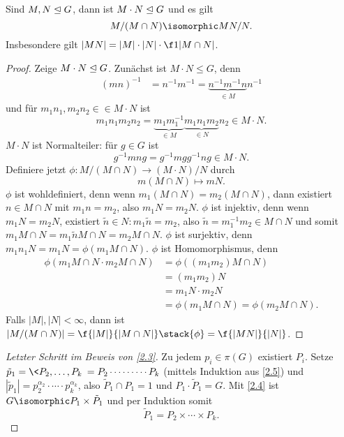 \begin{lem} \label{2.5}
	Sind $M, N \trianglelefteq G$, dann ist $M\cdot N \trianglelefteq G$ und es gilt
	\[
		M / (M\cap N)
		\isomorphic
		MN / N.
	\]
	Insbesondere gilt $|MN| = |M|\cdot|N| \cdot \f 1{|M \cap N|}$.
	\begin{proof}
		Zeige $M\cdot N \trianglelefteq G$.
		Zunächst ist $M \cdot N \le G$, denn
		\begin{align*}
			(mn)^{-1} &= n^{-1} m^{-1}
			= \underbrace{n^{-1}m^{-1}n}_{\in M} n^{-1}
		\end{align*}
		und für $m_1n_1, m_2n_2 \in \in M\cdot N$ ist
		\[
			m_1 n_1 m_2 n_2
			= \underbrace{m_1 m_1^{-1}}_{\in M} \underbrace{m_1 n_1 m_2}_{\in N} n_2
			\in M \cdot N.
		\]
		$M \cdot N$ ist Normalteiler:
		für $g \in G$ ist
		\[
			g^{-1} mn g
			= g^{-1} m g g^{-1} n g
			\in M \cdot N.
		\]
		Definiere jetzt $\phi: M / (M \cap N) \to (M \cdot N) / N$ durch
		\[
			m(M\cap N) \mapsto mN.
		\]
		$\phi$ ist wohldefiniert, denn wenn $m_1 (M \cap N) = m_2 (M \cap N)$, dann existiert $n \in M \cap N$ mit $m_1 n = m_2$, also $m_1 N = m_2 N$.
		$\phi$ ist injektiv, denn wenn $m_1 N = m_2 N$, existiert $\tilde n \in N: m_1 \tilde n = m_2$, also $\tilde n = m_1^{-1} m_2 \in M \cap N$ und somit $m_1 M\cap N = m_1 \tilde n M\cap N = m_2 M \cap N$.
		$\phi$ ist surjektiv, denn $m_1 n_1 N = m_1 N = \phi(m_1 M\cap N)$.
		$\phi$ ist Homomorphismus, denn
		\begin{align*}
			\phi(m_1 M\cap N \cdot m_2 M \cap N)
			&= \phi((m_1m_2)M\cap N) \\
			&= (m_1 m_2) N \\
			&= m_1N \cdot m_2 N \\
			&= \phi(m_1 M\cap N)
			= \phi(m_2 M\cap N).
		\end{align*}
		Falls $|M|, |N| < \infty$, dann ist $|M / (M\cap N) | = \f {|M|}{|M\cap N|} \stack{\phi}= \f {|MN|}{|N|}$.
	\end{proof}
\end{lem}

\begin{proof}[Letzter Schritt im Beweis von \ref{2.3}]
	Zu jedem $p_i \in \pi(G)$ existiert $P_i$.
	Setze $\tilde p_1 = \< P_2, \dotsc, P_k \> = P_2 \cdots \dotsb \cdots P_k$ (mittels Induktion aus \ref{2.5}) und $|\tilde p_1| = p_2^{\alpha_2} \cdot \dotsb \cdot p_k^{\alpha_k}$, also $\tilde P_1 \cap P_1 = 1$ und $P_1 \cdot \tilde P_1 = G$.
	Mit \ref{2.4} ist $G \isomorphic P_1 \times \tilde P_1$ und per Induktion somit
	\[
		\tilde P_1 = P_2 \times \dotsb \times P_k.
	\]
\end{proof}

